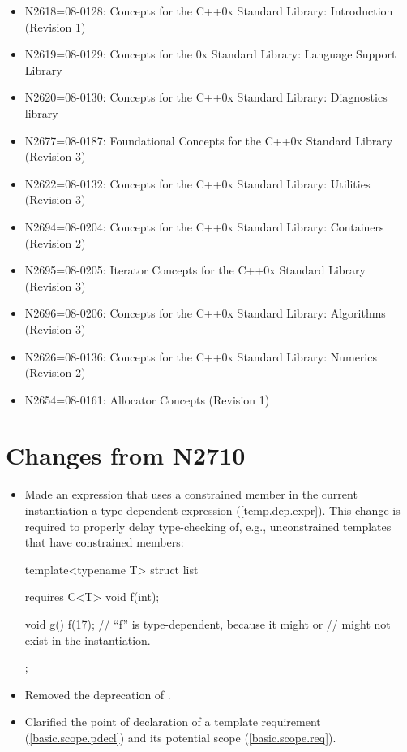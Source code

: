 \documentclass[american]{book}
\begin{document}
\begin{titlepage}
\begin{itemize}
\item N2618=08-0128: Concepts for the C++0x Standard Library: Introduction (Revision 1)
\item N2619=08-0129: Concepts for the \Cpp{}0x Standard Library:
  Language Support Library
\item N2620=08-0130: Concepts for the C++0x Standard Library:
  Diagnostics library
\item N2677=08-0187: Foundational Concepts for the C++0x Standard Library
  (Revision 3)
\item N2622=08-0132: Concepts for the C++0x Standard Library:
  Utilities (Revision 3)
\item N2694=08-0204: Concepts for the C++0x Standard Library:
  Containers (Revision 2)
\item N2695=08-0205: Iterator Concepts for the C++0x Standard Library
  (Revision 3)
\item N2696=08-0206: Concepts for the C++0x Standard Library:
  Algorithms (Revision 3)
\item N2626=08-0136: Concepts for the C++0x Standard Library: Numerics
  (Revision 2)
\item N2654=08-0161: Allocator Concepts (Revision 1)
\end{itemize}

\section*{Changes from N2710}
\begin{itemize}
\item Made an expression that uses a constrained member in the current
  instantiation a type-dependent expression
  (\ref{temp.dep.expr}). This change is required to properly delay
  type-checking of, e.g., unconstrained templates that have
  constrained members:
\begin{codeblock}
template<typename T>
struct list {
  requires C<T> void f(int);

  void g() { f(17); } // ``f'' is type-dependent, because it might or
                      // might not exist in the instantiation.
};
\end{codeblock}

\item Removed the deprecation of .

\item Clarified the point of declaration of a template requirement
  (\ref{basic.scope.pdecl}) and its potential scope
  (\ref{basic.scope.req}). 


\end{itemize}
\end{titlepage}
\end{document}
